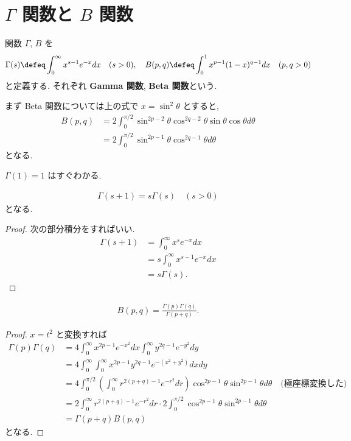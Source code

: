 \documentclass[openany, a4paper, oneside]{jsbook}
\begin{document}
\section{$\Gamma$ 関数と $B$ 関数}

\begin{defn}
関数 $\Gamma$, $B$ を
\begin{align}
 \Gamma (s)
 \defeq
 \int_0^{\infty} x^{s-1} e^{-x} dx \quad (s > 0 ),
 \quad
 B(p, q)
 \defeq
 \int_0^1 x^{p-1}(1-x)^{q-1} dx \quad (p, q > 0)
\end{align}
と定義する.
それぞれ \textbf{Gamma 関数}, \textbf{Beta 関数}という.
\end{defn}
まず Beta 関数については上の式で $x = \sin^2 \theta$ とすると,
\begin{align}
 B(p, q)
 &=
 2 \int_0^{\pi/2} \sin^{2p-2} \theta \cos^{2q-2} \theta \sin \theta \cos \theta d \theta \\
 &=
 2\int_0^{\pi/2} \sin^{2p-1} \theta \cos^{2q-1}\theta d\theta
\end{align}
となる.

$\Gamma(1) = 1$ はすぐわかる.
\begin{prop}
\begin{align}
 \Gamma(s+1)
 =
 s \Gamma (s) \quad (s>0)
\end{align}
となる.
\end{prop}
\begin{proof}
次の部分積分をすればいい.
\begin{align}
 \Gamma(s + 1)
 &=
 \int_0^{\infty} x^s e^{-x} dx \\
 &=
 s \int_0^{\infty} x^{s-1} e^{-x} dx \\
 &=
 s\Gamma(s).
\end{align}
\end{proof}

\begin{prop}
\begin{align}
 B(p, q)
 =
 \frac{\Gamma(p) \Gamma(q)}{\Gamma(p+q)}.
\end{align}
\end{prop}
\begin{proof}
$x = t^2$ と変換すれば
\begin{align}
 \Gamma(p) \Gamma(q)
 &=
 4 \int_0^{\infty}x^{2p-1} e^{-x^2}dx \int_0^{\infty}y^{2q-1} e^{-y^2} dy \\
 &=
 4 \int_0^{\infty} \int_0^{\infty} x^{2p-1} y^{2q-1} e^{-(x^2+y^2)} dxdy \\
 &=
 4 \int_0^{\pi/2} \left( \int_0^{\infty} r^{2(p+q)-1} e^{-r^2} dr \right)
  \cos^{2p-1}\theta \sin^{2p-1}\theta d\theta
  \quad \text{(極座標変換した)} \\
 &=
 2\int_0^{\infty} r^{2(p+q)-1} e^{-r^2} dr
  \cdot 2\int_0^{\pi/2} \cos^{2p-1}\theta \sin^{2p-1}\theta d\theta  \\
 &=
 \Gamma(p+q)B(p, q)
\end{align}
となる.
\end{proof}
\end{document}
